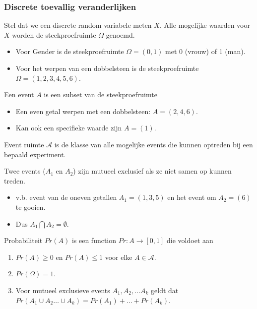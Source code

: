 \documentclass[
  dutch,
  letterpaper,
  12pt]{book}
\providecommand{\tightlist}{%
  \setlength{\itemsep}{0pt}\setlength{\parskip}{0pt}}
\theoremstyle{definition}
\theoremstyle{definition}
\theoremstyle{definition}
\theoremstyle{remark}
\begin{document}
\subsubsection{Discrete toevallig
veranderlijken}\label{discrete-toevallig-veranderlijken}

Stel dat we een discrete random variabele meten \(X\). Alle mogelijke
waarden voor \(X\) worden de steekproefruimte \(\Omega\) genoemd.

\begin{itemize}
\item
  Voor Gender is de steekproefruimte \(\Omega=(0,1)\) met 0 (vrouw) of 1
  (man).
\item
  Voor het werpen van een dobbelsteen is de steekproefruimte
  \(\Omega=(1,2,3,4,5,6)\).
\end{itemize}

Een event \(A\) is een subset van de steekproefruimte

\begin{itemize}
\tightlist
\item
  Een even getal werpen met een dobbelsteen: \(A=(2,4,6)\).
\item
  Kan ook een specifieke waarde zijn \(A=(1)\).
\end{itemize}

Event ruimte \(\mathcal{A}\) is de klasse van alle mogelijke events die
kunnen optreden bij een bepaald experiment.

Twee events (\(A_1\) en \(A_2\)) zijn mutueel exclusief als ze niet
samen op kunnen treden.

\begin{itemize}
\tightlist
\item
  v.b. event van de oneven getallen \(A_1=(1,3,5)\) en het event om
  \(A_2=(6)\) te gooien.
\item
  Dus \(A_1 \bigcap A_2=\emptyset\).
\end{itemize}

Probabiliteit \(Pr(A)\) is een function \(Pr: A \rightarrow [0,1]\) die
voldoet aan

\begin{enumerate}
\def\labelenumi{\arabic{enumi}.}
\tightlist
\item
  \(Pr(A) \geq 0\) en \(Pr(A) \leq 1\) voor elke \(A \in \mathcal{A}\).
\item
  \(Pr(\Omega)=1\).
\item
  Voor mutueel exclusieve events \(A_1, A_2, \ldots A_k\) geldt dat
  \(Pr(A_1 \cup A_2 \ldots \cup A_k)= Pr(A_1) + \ldots + Pr(A_k)\).
\end{enumerate}
\end{document}
